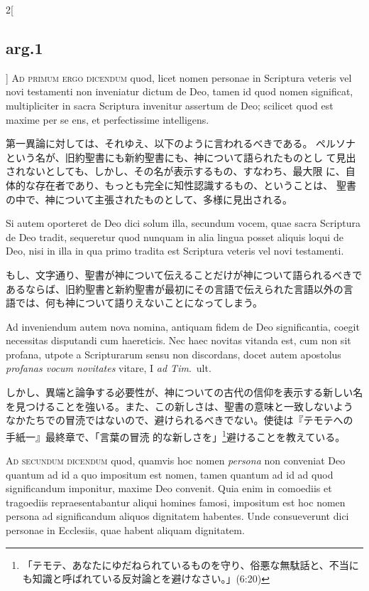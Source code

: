 \documentclass[paper=a4paper,fontsize=10pt,jafontsize=9pt,titlepage]{jlreq}
\begin{document}
\begin{paracol}{2}[\subsection{arg.1}]
{\scshape Ad primum ergo dicendum} quod, licet nomen personae in Scriptura veteris
vel novi testamenti non inveniatur dictum de Deo, tamen id quod nomen
significat, multipliciter in sacra Scriptura invenitur assertum de Deo;
scilicet quod est maxime per se ens, et perfectissime intelligens.

\switchcolumn

第一異論に対しては、それゆえ、以下のように言われるべきである。
ペルソナという名が、旧約聖書にも新約聖書にも、神について語られたものとし
 て見出されないとしても、しかし、その名が表示するもの、すなわち、最大限
 に、自体的な存在者であり、もっとも完全に知性認識するもの、ということは、
 聖書の中で、神について主張されたものとして、多様に見出される。

\switchcolumn*

Si
autem oporteret de Deo dici solum illa, secundum vocem, quae sacra
Scriptura de Deo tradit, sequeretur quod nunquam in alia lingua posset
aliquis loqui de Deo, nisi in illa in qua primo tradita est Scriptura
veteris vel novi testamenti.

\switchcolumn

もし、文字通り、聖書が神について伝えることだけが神について語られるべきで
 あるならば、旧約聖書と新約聖書が最初にその言語で伝えられた言語以外の言
 語では、何も神について語りえないことになってしまう。

\switchcolumn*

Ad inveniendum autem nova nomina, antiquam
fidem de Deo significantia, coegit necessitas disputandi cum
haereticis. Nec haec novitas vitanda est, cum non sit profana, utpote a
Scripturarum sensu non discordans, docet autem apostolus {\itshape profanas vocum
novitates} vitare, I {\itshape ad Tim}.~ult.

\switchcolumn

しかし、異端と論争する必要性が、神についての古代の信仰を表示する新しい名
 を見つけることを強いる。また、この新しさは、聖書の意味と一致しないよう
 なかたちでの冒涜ではないので、避けられるべきでない。使徒は『テモテへの
 手紙一』最終章で、「言葉の冒涜
 的な新しさを」\footnote{「テモテ、あなたにゆだねられているものを守り、俗悪な無駄話と、不当にも知識と呼ばれている反対論とを避けなさい。」(6:20)}避けることを教えている。

\switchcolumn*[\subsection{ad.2}]

{\scshape Ad secundum dicendum} quod, quamvis hoc nomen {\itshape persona} non conveniat Deo
quantum ad id a quo impositum est nomen, tamen quantum ad id ad quod
significandum imponitur, maxime Deo convenit. Quia enim in comoediis et
tragoediis repraesentabantur aliqui homines famosi, impositum est hoc
nomen persona ad significandum aliquos dignitatem habentes. 
Unde
consueverunt dici personae in Ecclesiis, quae habent aliquam
dignitatem.


\end{paracol}
\end{document}
